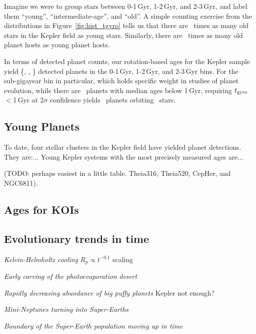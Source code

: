 \documentclass[11pt,twocolumn,tighten]{aastex63}
\begin{document}
Imagine we were to group stars between 0-1\,Gyr, 1-2\,Gyr, and
2-3\,Gyr, and label them ``young'', ``intermediate-age'', and ``old''.
A simple counting exercise from the distributions in
Figure~\ref{fig:hist_tgyro} tells us that there are \ratioobtoybstars\
times as many old stars in the Kepler field as young stars.
Similarly, there are \ratioobtoybplanets\ times as many old planet
hosts as young planet hosts. 

In terms of detected planet counts, our rotation-based ages for
the Kepler sample yield \{\nplyounggyro, \nplmidgyro, \nploldgyro\}
detected planets in the 0-1\,Gyr, 1-2\,Gyr, and 2-3\,Gyr bins.
For the sub-gigayear bin in particular, which holds specific weight in
studies of planet evolution, while there are \nplyounggyro\ planets
with median ages below 1\,Gyr, requiring $t_{\rm
gyro}$$<$1\,Gyr at 2$\sigma$ confidence yields
\nplyounggyrotwosigma\ planets orbiting \nplhostsyounggyrotwosigma\
stars.

\subsection{Young Planets}




To date, four stellar clusters in the Kepler field have yielded planet
detections.
They are:...
Young Kepler systems with the most precisely measured ages are...

(TODO: perhaps easiest in a little table.  Theia316, Theia520, CepHer,
and NGC6811).




\subsection{Ages for KOIs}

\subsection{Evolutionary trends in time}

{\it Kelvin-Helmholtz cooling}
$R_p \propto t^{-0.1}$ scaling \citep{Gupta_2019}

{\it Early carving of the photoevaporation desert}
\citep{Owen_Lai_2018}

{\it Rapidly decreasing abundance of big puffy planets}
Kepler not enough?

{\it Mini-Neptunes turning into Super-Earths}
\citep[e.g.][]{Rogers_2021}

{\it Boundary of the Super-Earth population moving up in time}
\citep{David_2021}
\end{document}
